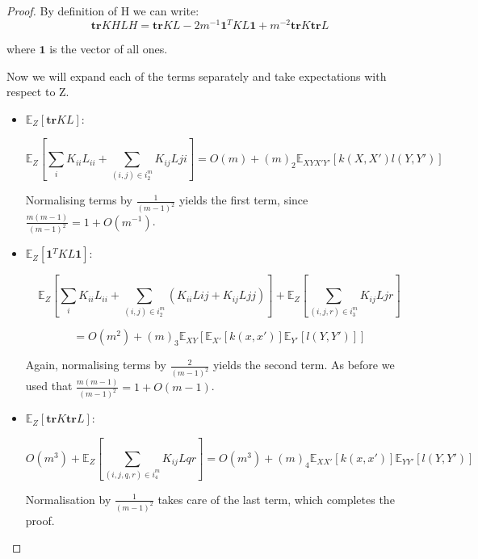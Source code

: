 \begin{proof}

By definition of H we can write:
\vspace{5mm}
$$
\textbf{tr}KHLH = \textbf{tr}KL - 2m^{-1}\mathbf{1}^{T}KL\mathbf{1} + m^{-2}\textbf{tr}K\textbf{tr}L
$$

where $\mathbf{1}$ is the vector of all ones.

Now we will expand each of the terms separately and take expectations with respect to Z.

\begin{itemize}


\item $\mathbb{E}_{Z}[\textbf{tr}KL]$:
\vspace{5mm}

$$
\mathbb{E}_{Z}[\sum_{i}K_{ii}L_{ii} + \sum_{(i,j)\in i_{2}^{m}}K_{ij}L{ji}] = O(m) +(m)_{2}\mathbb{E}_{XYX'Y'}[k(X,X')l(Y,Y')]
$$

Normalising terms by $\frac{1}{(m−1)^{2}}$ yields the first term, since $\frac{m(m−1)}{(m−1)^{2}}=1+O(m^{−1})$.

\item $\mathbb{E}_{Z}[\mathbf{1}^{T}KL\mathbf{1}]$:
\vspace{5mm}

$$
\mathbb{E}_{Z}[\sum_{i}K_{ii}L_{ii} + \sum_{(i,j)\in i_{2}^{m}}(K_{ii}L{ij} + K_{ij}L{jj})]  + \mathbb{E}_{Z}[\sum_{(i,j,r)\in i_{3}^{m}} K_{ij}L{jr}] $$

$$= O(m^{2}) +(m)_{3}\mathbb{E}_{XY}[\mathbb{E}_{X'}[k(x,x')]\mathbb{E}_{Y'}[l(Y,Y')]]
$$

Again, normalising terms by $\frac{2}{(m−1)^{2}}$ yields the second term. As before we used that  $\frac{m(m−1)}{(m−1)^{2}}=1+O(m−1)$.

\item $\mathbb{E}_{Z}[\textbf{tr}K\textbf{tr}L]$:
\vspace{5mm}

$$
O(m^{3}) + \mathbb{E}_{Z}[\sum_{(i,j,q,r)\in i_{4}^{m}} K_{ij}L{qr}] = O(m^{3}) + 
(m)_{4}\mathbb{E}_{XX'}[k(x,x')]\mathbb{E}_{YY'}[l(Y,Y')]
$$

Normalisation by $\frac{1}{(m−1)^{2}}$ takes care of the last term, which completes the proof.
\end{itemize}

\end{proof}


